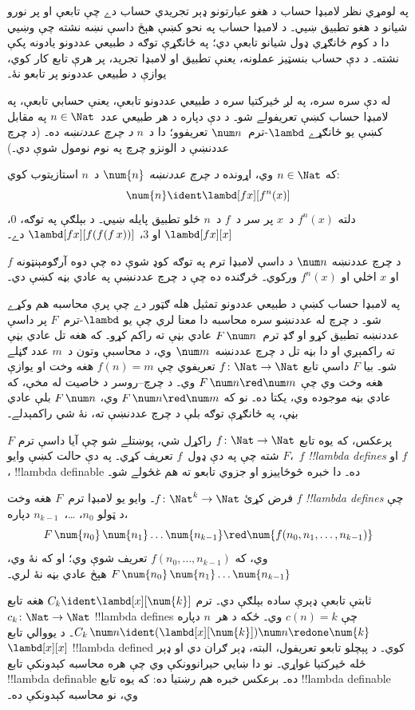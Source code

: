 \documentclass[../../../include/open-logic-section]{subfiles}
\begin{document}

په لومړي نظر لامبډا حساب د هغو عبارتونو ډېر تجريدي حساب دے چې
تابعې او پر نورو شيانو د هغو تطبيق ښيي۔ د لامبډا حساب په نحو کښې
هېڅ داسې نښه نشته چې وښيي دا د کوم ځانګړي ډول شيانو تابعې دي؛ په
ځانګړې توګه د طبيعي عددونو يادونه پکې نشته۔ د دې حساب بنسټيز عملونه،
يعنې تطبيق او لامبډا تجريد، پر هرې تابع کار کوي، يوازې د طبيعي
عددونو پر تابعو نۀ۔

له دې سره سره، په لږ ځيرکتيا سره د طبيعي عددونو تابعې، يعنې حسابي
تابعې، په لامبډا حساب کښې تعريفولے شو۔ د دې دپاره د هر طبيعي
عدد~$n \in \Nat$ په مقابل کښې يو ځانګړے $\lambd$-ترم~$\num n$
تعريفوو؛ دا د~$n$ \emph{د چرچ عددنښه} ده۔ (د چرچ عددنښې د الونزو
چرچ په نوم نومول شوې دي۔)

\begin{defn}
  که $n \in \Nat$ وي، اړونده \emph{د چرچ عددنښه} $\num{n}$
  د~$n$ استازيتوب کوي:
  \[
    \num{n} \ident \lambd[fx][f^n(x)]
  \]
  دلته $f^n(x)$ د~$x$ پر سر د~$f$ د~$n$ ځلو تطبيق پايله
  ښيي۔ د بېلګې په توګه، $\num{0}$، $\lambd[fx][x]$ او
  $\num{3}$، $\lambd[fx][f(f(f\,x))]$ دے۔
\end{defn}
  
د چرچ عددنښه $\num n$ د داسې لامبډا ترم په توګه کوډ شوې ده چې
دوه آرګومېنټونه $f$ او $x$ اخلي او $f^n(x)$ ورکوي۔ څرګنده ده چې
د چرچ عددنښې په عادي بڼه کښې دي۔

په لامبډا حساب کښې د طبيعي عددونو تمثيل هله ګټور دے چې پرې
محاسبه هم وکړے شو۔ د چرچ له عددنښو سره محاسبه دا معنا لري چې
يو $\lambd$-ترم~$F$ پر داسې عددنښه تطبيق کړو او ګډ ترم~$F\,
\num n$ عادي بڼې ته راکم کړو۔ که هغه تل عادي بڼې ته راکمېږي
او دا بڼه تل د چرچ عددنښه~$\num m$ وي، د محاسبې وتون د~$m$
عدد ګڼلے شو۔ بيا $F$ داسې تابع $f\colon \Nat \to \Nat$ تعريفوي
چې $f(n) = m$ هغه وخت او يوازې هغه وخت وي چې $F\, \num n
\red \num m$ وي۔ د چرچ--روسر د خاصيت له مخې، که عادي بڼه
موجوده وي، يکتا ده۔ نو که $F\, \num n \red \num m$ وي،
$F \, \num n$ بلې عادي بڼې، په ځانګړې توګه بلې د چرچ عددنښې ته،
نۀ شي راکمېدلے۔

پرعکس، که يوه تابع $f\colon \Nat \to \Nat$ راکړل شي، پوښتلے
شو چې آيا داسې ترم $F$ شته چې په دې ډول~$f$ تعريف کړي۔ په دې
حالت کښې وايو $F$،~$f$ \emph{!!{lambda define}s} او $f$،
!!{lambda definable} ده۔ دا خبره څوځاييزو او جزوي تابعو ته هم
غځولے شو۔

\begin{defn}
فرض کړئ $f\colon \Nat^k \to \Nat$۔ وايو يو لامبډا ترم~$F$
هغه وخت $f$ \emph{!!{lambda define}s} چې د ټولو
$n_0$، \dots،~$n_{k-1}$ دپاره،
\[
F \, \num{n_0} \, \num{n_1} \dots \num{n_{k-1}} \red \num{f(n_0, n_1, \dots,
  n_{k-1})}
\]
وي، که $f(n_0, \dots, n_{k-1})$ تعريف شوې وي؛ او که نۀ وي،
$F \, \num{n_0} \,
\num{n_1} \dots \num{n_{k-1}}$ هېڅ عادي بڼه نۀ لري۔
\end{defn}

ثابتې تابعې ډېرې ساده بېلګې دي۔ ترم $C_k \ident
\lambd[x][\num{k}]$ هغه تابع $c_k\colon \Nat \to
\Nat$ !!{lambda define}s چې $c(n) = k$ وي۔ ځکه د هر~$n$
دپاره $C_k \, \num n \ident
(\lambd[x][\num{k}])\num n \redone \num{k}$۔
د يووالي تابع $\lambd[x][x]$ !!{lambda defined} کوي۔ د پېچلو تابعو
تعريفول، البته، ډېر ګران دي او ډېر ځله ځيرکتيا غواړي۔ نو دا
ښايي حيرانوونکې وي چې هره محاسبه کېدونکې تابع
!!{lambda definable} ده۔ برعکس خبره هم رښتيا ده: که يوه تابع
!!{lambda definable} وي، نو محاسبه کېدونکې ده۔
\end{document}
